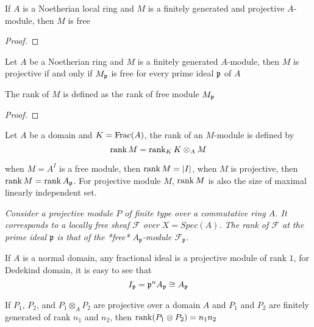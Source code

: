 \begin{longproof}
\end{longproof}

\begin{proposition}
	If $A$ is a Noetherian local ring and $M$ is a finitely generated and projective $A$-module, then $M$ is free
\end{proposition}

\begin{proof}
\end{proof}

\begin{proposition}
	Let $A$ be a Noetherian ring and $M$ is a finitely generated $A$-module, then $M$ is projective if and only if $M_{\mathfrak{p}}$ is free for every prime ideal $\mathfrak{p}$ of $A$
	
	The rank of $M$ is defined as the rank of free module $M_{\mathfrak{p}}$
\end{proposition}

\begin{proof}
\end{proof}

\begin{definition}
	Let $A$ be a domain and $K = \operatorname{Frac}(A)$, the rank of an $M$-module is defined by
	$$
		\operatorname{rank} M = \operatorname{rank}_K K \otimes_A M
	$$
	
	when $M = A^I$ is a free module, then $\operatorname{rank} M = \lvert I\rvert$, when $M$ is projective, then $\operatorname{rank} M = \operatorname{rank} A_{\mathfrak{p}}$. For projective module $M$, $\operatorname{rank} M$ is also the size of maximal linearly independent set.
	
	\textit{Consider a projective module $P$ of finite type over a commutative ring $A$. It corresponds to a locally free sheaf $\mathcal F $ over $X=Spec(A)$. The rank of $\mathcal F $ at the prime ideal $\mathfrak p$ is that of the *free* $A_{\mathfrak p}$-module $\mathcal F_{\mathfrak p}$.}	
\end{definition}

\begin{remark}
	If $A$ is a normal domain, any fractional ideal is a projective module of rank $1$, for Dedekind domain, it is easy to see that
	$$
		I_{\mathfrak{p}} = \mathfrak{p}^n A_{\mathfrak{p}} \cong A_{\mathfrak{p}}	
	$$
\end{remark}

\begin{proposition}
	If $P_1$, $P_2$, and $P_1 \otimes_A P_2$ are projective over a domain $A$ and $P_1$ and $P_2$ are finitely generated of rank $n_1$ and $n_2$, then $\operatorname{rank} (P_1 \otimes P_2) = n_1 n_2$
\end{proposition}

